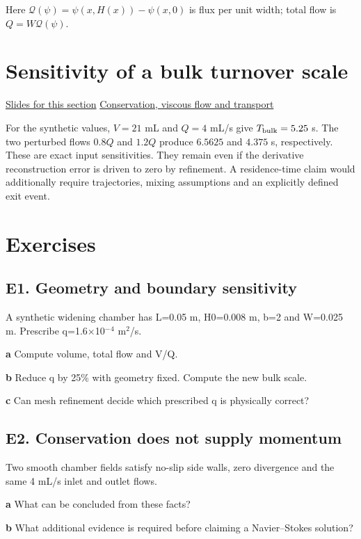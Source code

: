 \documentclass[11pt,letterpaper]{article}
\theoremstyle{definition}\newtheorem{definition}{Definition}\newtheorem{example}{Example}
\numberwithin{equation}{section}
\begin{document}
Here $\mathcal Q(\psi)=\psi(x,H(x))-\psi(x,0)$ is flux per unit width; total flow is $Q=W\mathcal Q(\psi)$.
\section{Sensitivity of a bulk turnover scale}
\hypertarget{note-sensitivity-of-a-bulk-turnover-scale}{}\label{note:sensitivity-of-a-bulk-turnover-scale}
{\small \href{slides.html\#frame=a-bulk-turnover-scale\&step=1}{Slides for this section} \quad \href{../modules/cfd/index.html}{Conservation, viscous flow and transport}}\par


For the synthetic values, $V=21$ mL and $Q=4$ mL/s give $T_{\rm bulk}=5.25$ s. The two perturbed flows $0.8Q$ and $1.2Q$ produce $6.5625$ and $4.375$ s, respectively. These are exact input sensitivities. They remain even if the derivative reconstruction error is driven to zero by refinement. A residence-time claim would additionally require trajectories, mixing assumptions and an explicitly defined exit event.
\bigskip
\section*{Exercises}
\par\noindent\begin{minipage}{\linewidth}
\subsection*{E1. Geometry and boundary sensitivity}
A synthetic widening chamber has L=\allowbreak{}0.05 m, H0=\allowbreak{}0.008 m, b=\allowbreak{}2 and W=\allowbreak{}0.025 m. Prescribe q=\allowbreak{}1.6$\times$10$^-$$^4$ m$^2$/s.

\textbf{a} Compute volume, total flow and V/Q.

\end{minipage}\par\medskip
\textbf{b} Reduce q by 25\% with geometry fixed. Compute the new bulk scale.

\textbf{c} Can mesh refinement decide which prescribed q is physically correct?

\par\noindent\begin{minipage}{\linewidth}
\subsection*{E2. Conservation does not supply momentum}
Two smooth chamber fields satisfy no-slip side walls, zero divergence and the same 4 mL/s inlet and outlet flows.

\textbf{a} What can be concluded from these facts?

\end{minipage}\par\medskip
\textbf{b} What additional evidence is required before claiming a Navier--Stokes solution?
\end{document}
